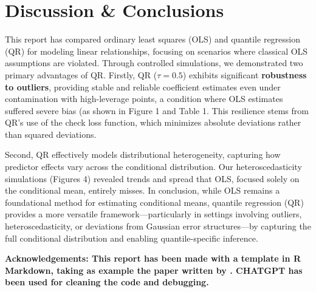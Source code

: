 \documentclass[fleqn,10pt]{latex/stylish_article} %
\begin{document}
\section{Discussion \& Conclusions}\label{discussion-conclusions}

This report has compared ordinary least squares (OLS) and quantile regression (QR) for modeling linear relationships, focusing on scenarios where classical OLS assumptions are violated. Through controlled simulations, we demonstrated two primary advantages of QR. Firstly, QR (\(\tau=0.5\)) exhibits significant \textbf{robustness to outliers}, providing stable and reliable coefficient estimates even under contamination with high-leverage points, a condition where OLS estimates suffered severe bias (as shown in Figure 1 and Table 1. This resilience stems from QR's use of the check loss function, which minimizes absolute deviations rather than squared deviations.

Second, QR effectively models distributional heterogeneity, capturing how predictor effects vary across the conditional distribution. Our heteroscedasticity simulations (Figures 4) revealed trends and spread that OLS, focused solely on the conditional mean, entirely misses. In conclusion, while OLS remains a foundational method for estimating conditional means, quantile regression (QR) provides a more versatile framework---particularly in settings involving outliers, heteroscedasticity, or deviations from Gaussian error structures---by capturing the full conditional distribution and enabling quantile-specific inference.

\textbf{Acknowledgements: This report has been made with a template in R Markdown, taking as example the paper written by \citet{FanLi2001}. CHATGPT has been used for cleaning the code and debugging.}



\makeatletter

\makeatother


\end{document}
